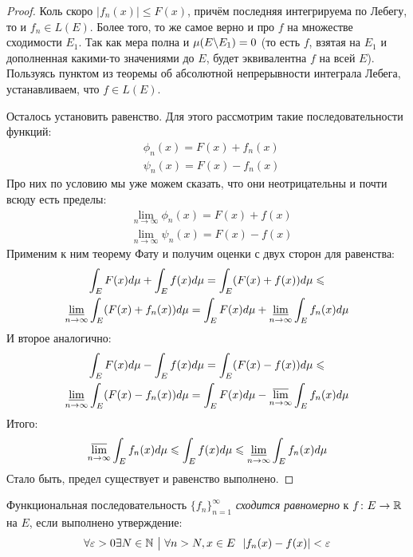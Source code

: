 \begin{proof}
	Коль скоро $|f_n(x)| \le F(x)$, причём последняя интегрируема по Лебегу, то и $f_n \in L(E)$. Более того, то же самое верно и про $f$ на множестве сходимости $E_1$. Так как мера полна и $\mu(E \bs E_1) = 0$ (то есть $f$, взятая на $E_1$ и дополненная какими-то значениями до $E$, будет эквивалентна $f$ на всей $E$). Пользуясь пунктом из теоремы об абсолютной непрерывности интеграла Лебега, устанавливаем, что $f \in L(E)$.
	
	Осталось установить равенство. Для этого рассмотрим такие последовательности функций:
	\begin{align*}
		&{\phi_n(x) = F(x) + f_n(x)}
		\\
		&{\psi_n(x) = F(x) - f_n(x)}
	\end{align*}
	Про них по условию мы уже можем сказать, что они неотрицательны и почти всюду есть пределы:
	\begin{align*}
		&{\lim_{n \to \infty} \phi_n(x) = F(x) + f(x)}
		\\
		&{\lim_{n \to \infty} \psi_n(x) = F(x) - f(x)}
	\end{align*}
	Применим к ним теорему Фату и получим оценки с двух сторон для равенства:
	\begin{multline*}
		\int_E F(x)d\mu + \int_E f(x)d\mu = \int_E (F(x) + f(x))d\mu \le
		\\
		\varliminf_{n \to \infty} \int_E (F(x) + f_n(x))d\mu = \int_E F(x)d\mu + \varliminf_{n \to \infty} \int_E f_n(x)d\mu
	\end{multline*}
	И второе аналогично:
	\begin{multline*}
		\int_E F(x)d\mu - \int_E f(x)d\mu = \int_E (F(x) - f(x))d\mu \le
		\\
		\varliminf_{n \to \infty} \int_E (F(x) - f_n(x))d\mu = \int_E F(x)d\mu - \varlimsup_{n \to \infty} \int_E f_n(x)d\mu
	\end{multline*}
	Итого:
	\[
		\varlimsup_{n \to \infty} \int_E f_n(x)d\mu \le \int_E f(x)d\mu \le \varliminf_{n \to \infty} \int_E f_n(x)d\mu
	\]
	Стало быть, предел существует и равенство выполнено.
\end{proof}

\begin{reminder}
	Функциональная последовательность $\{f_n\}_{n = 1}^\infty$ \textit{сходится равномерно} к $f \colon E \to \R$ на $E$, если выполнено утверждение:
	\[
		\forall \eps > 0 \exists N \in \N \such \forall n > N, x \in E\ \ |f_n(x) - f(x)| < \eps
	\]
\end{reminder}

